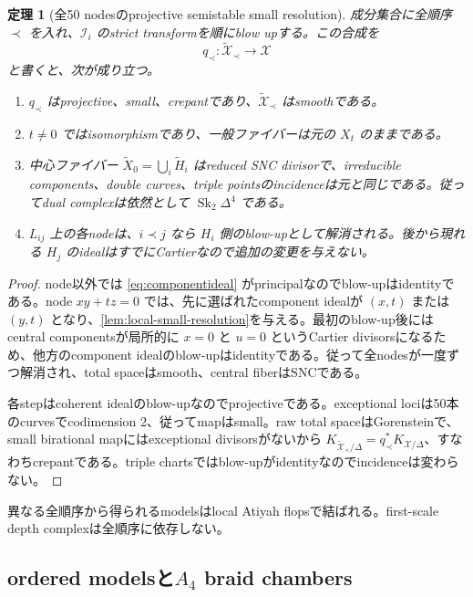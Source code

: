 \documentclass[11pt,a4paper]{ltjsarticle}
\newtheorem{theorem}{定理}[section]
\theoremstyle{definition}
\theoremstyle{remark}
\newcommand{\Sk}{\operatorname{Sk}}
\begin{document}
\begin{theorem}[全50 nodesのprojective semistable small resolution]\label{thm:global-small-resolution}
成分集合に全順序 $\prec$ を入れ、$\mathcal I_i$ のstrict transformを順にblow upする。この合成を
\[
 q_\prec:\widetilde{\mathcal X}_\prec\longrightarrow\mathcal X
\]
と書くと、次が成り立つ。
\begin{enumerate}[label=(\roman*),leftmargin=2.6em]
\item $q_\prec$ はprojective、small、crepantであり、$\widetilde{\mathcal X}_\prec$ はsmoothである。
\item $t\ne0$ ではisomorphismであり、一般ファイバーは元の $X_t$ のままである。
\item 中心ファイバー $\widetilde X_0=\bigcup_i\widetilde H_i$ はreduced SNC divisorで、irreducible components、double curves、triple pointsのincidenceは元と同じである。従ってdual complexは依然として $\Sk_2\Delta^4$ である。
\item $L_{ij}$ 上の各nodeは、$i\prec j$ なら $H_i$ 側のblow-upとして解消される。後から現れる $H_j$ のidealはすでにCartierなので追加の変更を与えない。
\end{enumerate}
\end{theorem}

\begin{proof}
node以外では \eqref{eq:componentideal} がprincipalなのでblow-upはidentityである。node $xy+tz=0$ では、先に選ばれたcomponent idealが $(x,t)$ または $(y,t)$ となり、\cref{lem:local-small-resolution}を与える。最初のblow-up後にはcentral componentsが局所的に $x=0$ と $u=0$ というCartier divisorsになるため、他方のcomponent idealのblow-upはidentityである。従って全nodesが一度ずつ解消され、total spaceはsmooth、central fiberはSNCである。

各stepはcoherent idealのblow-upなのでprojectiveである。exceptional lociは50本のcurvesでcodimension 2、従ってmapはsmall。raw total spaceはGorensteinで、small birational mapにはexceptional divisorsがないから
$K_{\widetilde{\mathcal X}_\prec/\Delta}=q_\prec^*K_{\mathcal X/\Delta}$、すなわちcrepantである。triple chartsではblow-upがidentityなのでincidenceは変わらない。
\end{proof}

異なる全順序から得られるmodelsはlocal Atiyah flopsで結ばれる。first-scale depth complexは全順序に依存しない。

\subsection{ordered modelsと$A_4$ braid chambers}
\end{document}
